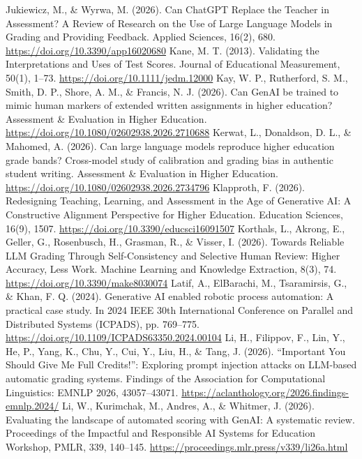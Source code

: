 Jukiewicz, M., \& Wyrwa, M. (2026). Can ChatGPT Replace the Teacher in Assessment? A Review of Research on the Use of Large Language Models in Grading and Providing Feedback. Applied Sciences, 16(2), 680. \url{https://doi.org/10.3390/app16020680}
 Kane, M. T. (2013). Validating the Interpretations and Uses of Test Scores. Journal of Educational Measurement, 50(1), 1--73. \url{https://doi.org/10.1111/jedm.12000}
 Kay, W. P., Rutherford, S. M., Smith, D. P., Shore, A. M., \& Francis, N. J. (2026). Can GenAI be trained to mimic human markers of extended written assignments in higher education? Assessment \& Evaluation in Higher Education. \url{https://doi.org/10.1080/02602938.2026.2710688}
 Kerwat, L., Donaldson, D. L., \& Mahomed, A. (2026). Can large language models reproduce higher education grade bands? Cross-model study of calibration and grading bias in authentic student writing. Assessment \& Evaluation in Higher Education. \url{https://doi.org/10.1080/02602938.2026.2734796}
 Klapproth, F. (2026). Redesigning Teaching, Learning, and Assessment in the Age of Generative AI: A Constructive Alignment Perspective for Higher Education. Education Sciences, 16(9), 1507. \url{https://doi.org/10.3390/educsci16091507}
 Korthals, L., Akrong, E., Geller, G., Rosenbusch, H., Grasman, R., \& Visser, I. (2026). Towards Reliable LLM Grading Through Self-Consistency and Selective Human Review: Higher Accuracy, Less Work. Machine Learning and Knowledge Extraction, 8(3), 74. \url{https://doi.org/10.3390/make8030074}
 Latif, A., ElBarachi, M., Tsaramirsis, G., \& Khan, F. Q. (2024). Generative AI enabled robotic process automation: A practical case study. In 2024 IEEE 30th International Conference on Parallel and Distributed Systems (ICPADS), pp. 769--775. \url{https://doi.org/10.1109/ICPADS63350.2024.00104}
 Li, H., Filippov, F., Lin, Y., He, P., Yang, K., Chu, Y., Cui, Y., Liu, H., \& Tang, J. (2026). ``Important You Should Give Me Full Credits!'': Exploring prompt injection attacks on LLM-based automatic grading systems. Findings of the Association for Computational Linguistics: EMNLP 2026, 43057--43071. \url{https://aclanthology.org/2026.findings-emnlp.2024/}
 Li, W., Kurimchak, M., Andres, A., \& Whitmer, J. (2026). Evaluating the landscape of automated scoring with GenAI: A systematic review. Proceedings of the Impactful and Responsible AI Systems for Education Workshop, PMLR, 339, 140--145. \url{https://proceedings.mlr.press/v339/li26a.html}
